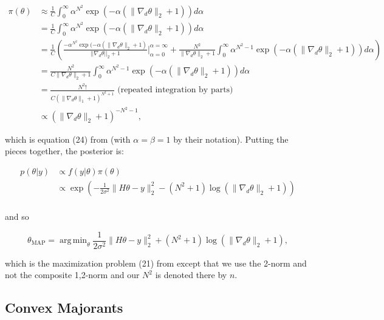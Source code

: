 \documentclass[paper=a4, fontsize=11pt]{scrartcl} %
\DeclareMathOperator*{\argmin}{arg\,min}
\numberwithin{equation}{section} %
\numberwithin{figure}{section} %
\numberwithin{table}{section} %
\newcommand{\grad}{\nabla_{d} }
\begin{document}
\begin{align*}
 \pi (\theta) &\approx \frac{1}{C} \int_{0}^{\infty} \alpha^{N^2 } \exp( -\alpha (\|\grad\theta\|_2 + 1)) d\alpha \\
 &= \frac{1}{C} \int_{0}^{\infty} \alpha^{N^2} \exp( -\alpha (\|\grad\theta\|_2 + 1)) d\alpha \\
 &= \frac{1}{C} \left (
 \frac{-\alpha^{N^2} \exp(-\alpha (\|\grad\theta\|_2 + 1)}{||\grad\theta||_2 + 1} \bigg |_{\alpha=0}^{\alpha=\infty}
 +\frac{N^2}{\|\grad\theta\|_2 + 1}\int_{0}^{\infty} \alpha^{N^2-1} \exp( -\alpha (\|\grad\theta\|_2 + 1)) d\alpha \right ) \\
 &= \frac{N^2}{C\|\grad\theta\|_2 + 1}\int_{0}^{\infty} \alpha^{N^2-1} \exp( -\alpha (\|\grad\theta\|_2 + 1)) d\alpha \\
 &= \frac{ N^2!}{ C(\|\grad\theta\|_1 + 1)^{N^2+1}} \text{ (repeated integration by parts)}\\
 &\propto (\|\grad\theta\|_2 + 1)^{-N^2-1},
\end{align*}

which is equation (24) from \cite{oliveira2009adaptive} (with $\alpha
= \beta = 1$ by their notation). Putting the pieces together, the
posterior is:

\begin{align*}
  p(\theta | y ) &\propto f(y | \theta ) \pi(\theta ) \\
  &\propto \exp \left ( -\frac{1}{2\sigma^2} \|H\theta - y\|_2^2 - (N^2 + 1) \log (\|\grad\theta\|_2 + 1) \right ) \\
\end{align*}
 
and so 

\begin{equation*}
\theta_{\text{MAP}} = \argmin_{\theta} \frac{1}{2\sigma^2} \|H\theta - y\|_2^2 + (N^2 + 1) \log (\|\grad\theta\|_2 + 1),
\end{equation*}

which is the maximization problem (21) from \cite{green2015bayesian}
except that we use the 2-norm and not the composite 1,2-norm and our
$N^2$ is denoted there by $n$.

\subsection{Convex Majorants}
\end{document}
